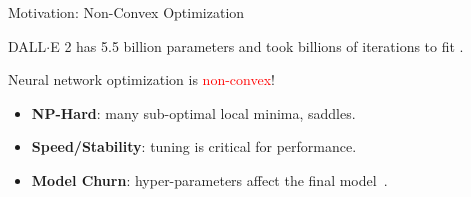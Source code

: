 \documentclass[usenames,dvipsnames,mathserif,notheorems]{beamer}
\begin{document}
\begin{frame}{Motivation: Non-Convex Optimization}

	\begin{center}
		\Large
		DALL$\cdot$E 2 has 5.5 billion parameters and took billions of iterations to fit \citep{ramesh2022dalle}.
	\end{center}

	\vspace{1em}

	Neural network optimization is \textcolor{red}{non-convex}!
	\vspace{0.2em}
	\begin{itemize}
		\item \textbf{NP-Hard}: many sub-optimal local minima, saddles.
		\item \textbf{Speed/Stability}: tuning is critical for performance.
		\item \textbf{Model Churn}: hyper-parameters affect the final model~\citep{henderson2018deep}.
	\end{itemize}

	\begin{figure}[b]
		\centering
		
	\end{figure}

\end{frame}
\end{document}
